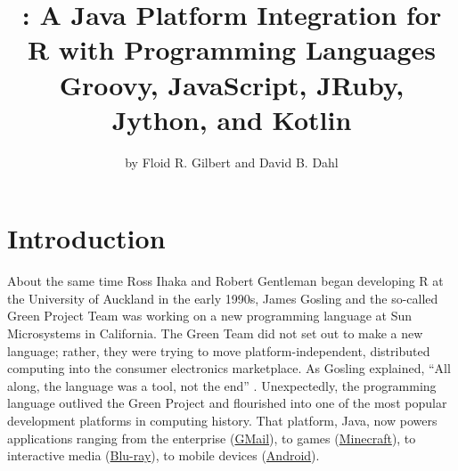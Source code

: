 \title{: A Java Platform Integration for R with Programming Languages Groovy, JavaScript, JRuby, Jython, and Kotlin}
\author{by Floid R. Gilbert and David B. Dahl}

\maketitle


\hypertarget{introduction}{}
\section{Introduction}

About the same time Ross Ihaka and Robert Gentleman began developing R at the University of Auckland in the early 1990s, James Gosling and the so-called Green Project Team was working on a new programming language at Sun Microsystems in California. The Green Team did not set out to make a new language; rather, they were trying to move platform-independent, distributed computing into the consumer electronics marketplace. As Gosling explained, ``All along, the language was a tool, not the end'' \citep{javainsidestory}. Unexpectedly, the programming language outlived the Green Project and flourished into one of the most popular development platforms in computing history. That platform, Java, now powers applications ranging from the enterprise (\href{https://www.google.com/gmail/about/}{GMail}), to games (\href{https://minecraft.net}{Minecraft}), to interactive media (\href{https://en.wikipedia.org/wiki/Blu-ray}{Blu-ray}), to mobile devices (\href{https://www.android.com/}{Android}).

